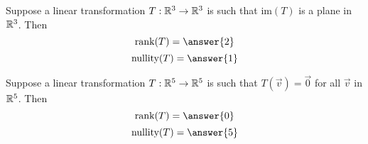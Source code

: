 \documentclass{ximera}
\begin{document}
    \begin{problem}\label{prob:ranknullityT4}
    Suppose a linear transformation $T:\mathbb{R}^3\rightarrow \mathbb{R}^3$ is such that $\mbox{im}(T)$ is a plane in $\mathbb{R}^3$.  Then
    $$\mbox{rank}(T)=\answer{2}$$ $$\mbox{nullity}(T)=\answer{1}$$
    \end{problem}
     
    \begin{problem}\label{prob:ranknullityT5}
    Suppose a linear transformation $T:\mathbb{R}^5\rightarrow \mathbb{R}^5$ is such that $T(\vec{v})=\vec{0}$ for all $\vec{v}$ in $\mathbb{R}^5$.  Then
    $$\mbox{rank}(T)=\answer{0}$$ $$\mbox{nullity}(T)=\answer{5}$$
    \end{problem}
\end{document}
